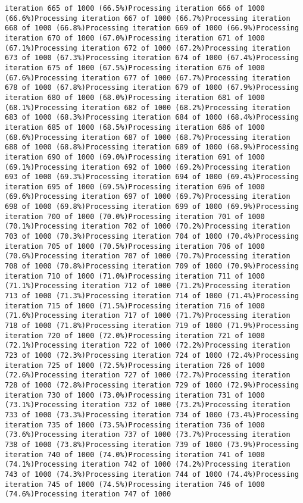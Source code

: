 \documentclass[
]{article}
\begin{document}
\begin{verbatim}
iteration 665 of 1000 (66.5%)Processing iteration 666 of 1000 (66.6%)Processing iteration 667 of 1000 (66.7%)Processing iteration 668 of 1000 (66.8%)Processing iteration 669 of 1000 (66.9%)Processing iteration 670 of 1000 (67.0%)Processing iteration 671 of 1000 (67.1%)Processing iteration 672 of 1000 (67.2%)Processing iteration 673 of 1000 (67.3%)Processing iteration 674 of 1000 (67.4%)Processing iteration 675 of 1000 (67.5%)Processing iteration 676 of 1000 (67.6%)Processing iteration 677 of 1000 (67.7%)Processing iteration 678 of 1000 (67.8%)Processing iteration 679 of 1000 (67.9%)Processing iteration 680 of 1000 (68.0%)Processing iteration 681 of 1000 (68.1%)Processing iteration 682 of 1000 (68.2%)Processing iteration 683 of 1000 (68.3%)Processing iteration 684 of 1000 (68.4%)Processing iteration 685 of 1000 (68.5%)Processing iteration 686 of 1000 (68.6%)Processing iteration 687 of 1000 (68.7%)Processing iteration 688 of 1000 (68.8%)Processing iteration 689 of 1000 (68.9%)Processing iteration 690 of 1000 (69.0%)Processing iteration 691 of 1000 (69.1%)Processing iteration 692 of 1000 (69.2%)Processing iteration 693 of 1000 (69.3%)Processing iteration 694 of 1000 (69.4%)Processing iteration 695 of 1000 (69.5%)Processing iteration 696 of 1000 (69.6%)Processing iteration 697 of 1000 (69.7%)Processing iteration 698 of 1000 (69.8%)Processing iteration 699 of 1000 (69.9%)Processing iteration 700 of 1000 (70.0%)Processing iteration 701 of 1000 (70.1%)Processing iteration 702 of 1000 (70.2%)Processing iteration 703 of 1000 (70.3%)Processing iteration 704 of 1000 (70.4%)Processing iteration 705 of 1000 (70.5%)Processing iteration 706 of 1000 (70.6%)Processing iteration 707 of 1000 (70.7%)Processing iteration 708 of 1000 (70.8%)Processing iteration 709 of 1000 (70.9%)Processing iteration 710 of 1000 (71.0%)Processing iteration 711 of 1000 (71.1%)Processing iteration 712 of 1000 (71.2%)Processing iteration 713 of 1000 (71.3%)Processing iteration 714 of 1000 (71.4%)Processing iteration 715 of 1000 (71.5%)Processing iteration 716 of 1000 (71.6%)Processing iteration 717 of 1000 (71.7%)Processing iteration 718 of 1000 (71.8%)Processing iteration 719 of 1000 (71.9%)Processing iteration 720 of 1000 (72.0%)Processing iteration 721 of 1000 (72.1%)Processing iteration 722 of 1000 (72.2%)Processing iteration 723 of 1000 (72.3%)Processing iteration 724 of 1000 (72.4%)Processing iteration 725 of 1000 (72.5%)Processing iteration 726 of 1000 (72.6%)Processing iteration 727 of 1000 (72.7%)Processing iteration 728 of 1000 (72.8%)Processing iteration 729 of 1000 (72.9%)Processing iteration 730 of 1000 (73.0%)Processing iteration 731 of 1000 (73.1%)Processing iteration 732 of 1000 (73.2%)Processing iteration 733 of 1000 (73.3%)Processing iteration 734 of 1000 (73.4%)Processing iteration 735 of 1000 (73.5%)Processing iteration 736 of 1000 (73.6%)Processing iteration 737 of 1000 (73.7%)Processing iteration 738 of 1000 (73.8%)Processing iteration 739 of 1000 (73.9%)Processing iteration 740 of 1000 (74.0%)Processing iteration 741 of 1000 (74.1%)Processing iteration 742 of 1000 (74.2%)Processing iteration 743 of 1000 (74.3%)Processing iteration 744 of 1000 (74.4%)Processing iteration 745 of 1000 (74.5%)Processing iteration 746 of 1000 (74.6%)Processing iteration 747 of 1000 
\end{verbatim}
\end{document}

